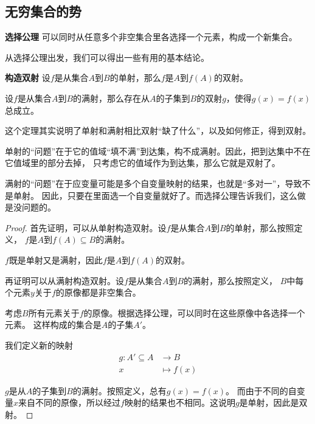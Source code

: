 \documentclass[12pt,UTF8,fontset=none]{ctexbook}
\begin{document}
\begin{appendix}

\chapter{无穷集合的势}

\begin{po}{\textbf{选择公理}}
    可以同时从任意多个非空集合里各选择一个元素，构成一个新集合。
\end{po}

从选择公理出发，我们可以得出一些有用的基本结论。

\begin{tm}{\textbf{构造双射}}\label{tm:a-1-0}
    设$f$是从集合$A$到$B$的单射，那么$f$是$A$到$f(A)$的双射。

    设$f$是从集合$A$到$B$的满射，那么存在从$A$的子集到$B$的双射$g$，使得$g(x) = f(x)$总成立。
\end{tm}

这个定理其实说明了单射和满射相比双射“缺了什么”，以及如何修正，得到双射。

单射的“问题”在于它的值域“填不满”到达集，构不成满射。因此，把到达集中不在它值域里的部分去掉，
只考虑它的值域作为到达集，那么它就是双射了。

满射的“问题”在于应变量可能是多个自变量映射的结果，也就是“多对一”，导致不是单射。
因此，只要在里面选一个自变量就好了。而选择公理告诉我们，这么做是没问题的。

\begin{proof}
    首先证明，可以从单射构造双射。设$f$是从集合$A$到$B$的单射，那么按照定义，
    $f$是$A$到$f(A)\subseteq B$的满射。

    $f$既是单射又是满射，因此$f$是$A$到$f(A)$的双射。

    再证明可以从满射构造双射。设$f$是从集合$A$到$B$的满射，那么按照定义，
    $B$中每个元素$y$关于$f$的原像都是非空集合。

    考虑$B$所有元素关于$f$的原像。根据选择公理，可以同时在这些原像中各选择一个元素。
    这样构成的集合是$A$的子集$A'$。

    我们定义新的映射
    \begin{align*}
        g: A'\subseteq A &\rightarrow B \\
        x &\mapsto f(x)
    \end{align*}
    
    $g$是从$A$的子集到$B$的满射。按照定义，总有$g(x) = f(x)$。
    而由于不同的自变量$x$来自不同的原像，所以经过$f$映射的结果也不相同。这说明$g$是单射，因此是双射。


\end{proof}
\end{appendix}
\end{document}
